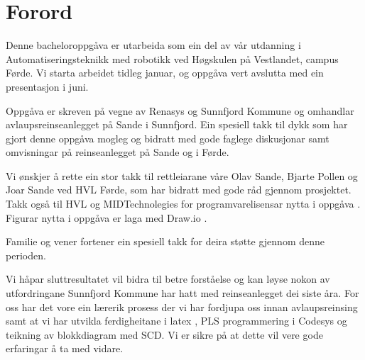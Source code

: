 \chapter{Forord}
\thispagestyle{romanpages}

Denne bacheloroppgåva er utarbeida som ein del av vår utdanning i Automatiseringsteknikk med robotikk ved Høgskulen på Vestlandet, campus Førde.
Vi starta arbeidet tidleg januar, og oppgåva vert avslutta med ein presentasjon i juni.

Oppgåva er skreven på vegne av \gls{Renasys} \citep{Renasys} og \gls{Sunnfjord Kommune} \citep{SunnfjordKommune} og omhandlar 
avlaupsreinseanlegget på Sande i Sunnfjord. 
Ein spesiell takk til dykk som har gjort denne oppgåva mogleg og
bidratt med gode faglege diskusjonar samt omvisningar på reinseanlegget på Sande og i Førde.

Vi ønskjer å rette ein stor takk til rettleiarane våre Olav Sande, Bjarte Pollen og Joar Sande ved \gls{HVL} Førde, som har bidratt med gode råd gjennom prosjektet.
Takk også til \gls{HVL} \citep{HVL} og MIDTechnolegies \citep{MIDT} for programvarelisensar nytta i oppgåva \citep{MIDTToolbox} \citep{Microsoft}.
Figurar nytta i oppgåva er laga med Draw.io \citep{DrawIO}.

Familie og vener fortener ein spesiell takk for deira støtte gjennom denne perioden.

Vi håpar sluttresultatet vil bidra til betre forståelse og kan løyse nokon av utfordringane \gls{Sunnfjord Kommune} har hatt med reinseanlegget dei siste åra.
For oss har det vore ein lærerik prosess der vi har fordjupa oss innan avlaupsreinsing samt at vi har utvikla ferdigheitane i \gls{latex} \citep{MikTeX} \citep{VisualStudio}, 
\gls{PLS} programmering i \gls{Codesys} \citep{Codesys} og teikning av blokkdiagram med \gls{SCD}. Vi er sikre på at dette vil vere gode erfaringar å ta med vidare.
 